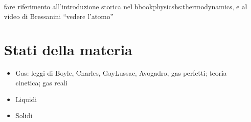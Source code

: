 \documentclass[letterpaper,10pt,english]{jupyterBook}
\begin{document}
\sphinxAtStartPar
{} fare riferimento all’introduzione storica nel bbook\sphinxhyphen{}physics\sphinxhyphen{}hs:thermodynamics, e al video di Bressanini “vedere l’atomo”


\section{Stati della materia}
\label{\detokenize{ch/units:stati-della-materia}}\begin{itemize}
\item {} 
\sphinxAtStartPar
Gas: leggi di Boyle, Charles, Gay\sphinxhyphen{}Lussac, Avogadro, gas perfetti; teoria cinetica; gas reali

\item {} 
\sphinxAtStartPar
Liquidi

\item {} 
\sphinxAtStartPar
Solidi

\end{itemize}
\end{document}
